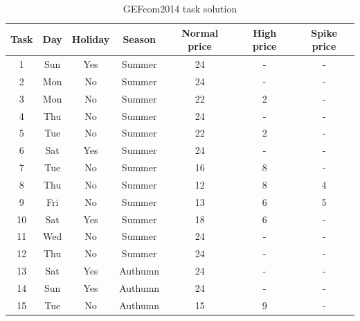 \documentclass[review]{elsarticle}
\begin{document}
    \begin{table}[H]
      \caption{GEFcom2014 task solution}
      \begin{center}
      \begin{tabular}{|c|c|c|c|c|c|c|}
      \hline
      Task & Day & Holiday & Season & Normal price & High price & Spike price\\
      \hline
      1 & Sun & Yes & Summer & 24 & - & -\\
      2 & Mon & No & Summer & 24 & - & -\\
      3 & Mon & No & Summer & 22 & 2 & -\\
      4 & Thu & No & Summer & 24 & - & -\\
      5 & Tue & No & Summer & 22 & 2 & -\\
      6 & Sat & Yes & Summer & 24 & - & -\\
      7 & Tue & No & Summer & 16 & 8 & -\\
      8 & Thu & No & Summer & 12 & 8 & 4\\
      9 & Fri & No & Summer & 13 & 6 & 5\\
      10 & Sat & Yes & Summer & 18 & 6 & -\\
      11 & Wed & No & Summer & 24 & - & -\\
      12 & Thu & No & Summer & 24 & - & -\\
      13 & Sat & Yes & Authumn & 24 & - & -\\
      14 & Sun & Yes & Authumn & 24 & - & -\\
      15 & Tue & No & Authumn & 15 & 9 & -\\
      \hline
      \end{tabular}
      \label{table:price_data_set}
      \end{center}
    \end{table}
\end{document}
